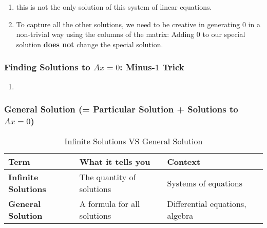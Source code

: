 \begin{enumerate}
    \item this is not the only solution of this system of linear equations.
    \hfill \cite{mfml/book/mml/Deisenroth-Faisal-Ong}

    \item To capture all the other solutions, we need to be creative in generating $0$ in a non-trivial way using the columns of the matrix: Adding $0$ to our special solution \textbf{does not} change the special solution. 
    \hfill \cite{mfml/book/mml/Deisenroth-Faisal-Ong}

    
\end{enumerate}







\subsubsection{Finding Solutions to $Ax=0$: Minus-$1$ Trick \cite{mfml/book/mml/Deisenroth-Faisal-Ong}}

\begin{enumerate}
    \item 

\end{enumerate}










\subsubsection{General Solution (= Particular Solution + Solutions to $Ax=0$)}

\begin{customArrayStretch}{1.3}
\begin{table}[H]
    \centering
    \begin{tabular}{|l|l|l|}
        \hline
        \textbf{Term} & 
            \textbf{What it tells you} & 
            \textbf{Context} \\ \hline

        \textbf{Infinite Solutions} & 
            The quantity of solutions & 
            Systems of equations \\ \hline

        \textbf{General Solution} & 
            A formula for all solutions & 
            Differential equations, algebra \\ \hline

    \end{tabular}
    \caption*{Infinite Solutions VS General Solution \cite{common/online/chatgpt}}
\end{table}
\end{customArrayStretch}


